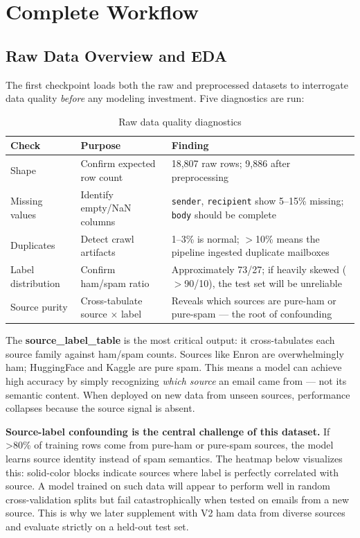 \section{Complete Workflow}

\subsection{Raw Data Overview and EDA}

The first checkpoint loads both the raw and preprocessed datasets to interrogate data quality \textit{before} any modeling investment. Five diagnostics are run:

\begin{table}[H]
\centering{}
\begin{tabular}{L{3cm} L{6.5cm} L{4.5cm}}
\toprule{}\color{white}\textbf{Check} &\color{white}\textbf{Purpose} &\color{white}\textbf{Finding}\\
\midrule
Shape & Confirm expected row count & 18,807 raw rows; 9,886 after preprocessing\\
Missing values & Identify empty/NaN columns & \texttt{sender}, \texttt{recipient} show 5--15\% missing; \texttt{body} should be complete\\
Duplicates & Detect crawl artifacts & 1--3\% is normal; $>$10\% means the pipeline ingested duplicate mailboxes\\
Label distribution & Confirm ham/spam ratio & Approximately 73/27; if heavily skewed ($>$90/10), the test set will be unreliable\\
Source purity & Cross-tabulate source $\times$ label & Reveals which sources are pure-ham or pure-spam — the root of confounding\\
\bottomrule
\end{tabular}
\caption{Raw data quality diagnostics}
\end{table}

The \textbf{source\_label\_table} is the most critical output: it cross-tabulates each source family against ham/spam counts. Sources like Enron are overwhelmingly ham; HuggingFace and Kaggle are pure spam. This means a model can achieve high accuracy by simply recognizing \textit{which source} an email came from — not its semantic content. When deployed on new data from unseen sources, performance collapses because the source signal is absent.

\begin{notebox}
\textbf{Source-label confounding is the central challenge of this dataset.} If >80\% of training rows come from pure-ham or pure-spam sources, the model learns source identity instead of spam semantics. The heatmap below visualizes this: solid-color blocks indicate sources where label is perfectly correlated with source. A model trained on such data will appear to perform well in random cross-validation splits but fail catastrophically when tested on emails from a new source. This is why we later supplement with V2 ham data from diverse sources and evaluate strictly on a held-out test set.
\end{notebox}


